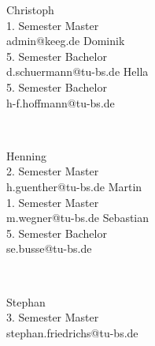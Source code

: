 {Christoph\\ 1. Semester Master\\ admin@keeg.de}
\hfill
{}
{Dominik\\5. Semester Bachelor\\ d.schuermann@tu-bs.de}
\hfill
{}
{Hella\\ 5. Semester Bachelor\\ h-f.hoffmann@tu-bs.de}
\par \ \par
{}
{Henning\\ 2. Semester Master\\ h.guenther@tu-bs.de}
\hfill
{}
{Martin\\ 1. Semester Master\\ m.wegner@tu-bs.de}
\hfill
{}
{Sebastian\\ 5. Semester Bachelor\\ se.busse@tu-bs.de}
\par \ \par
{}
{Stephan\\ 3. Semester Master\\ stephan.friedrichs@tu-bs.de}


\twocolumn
